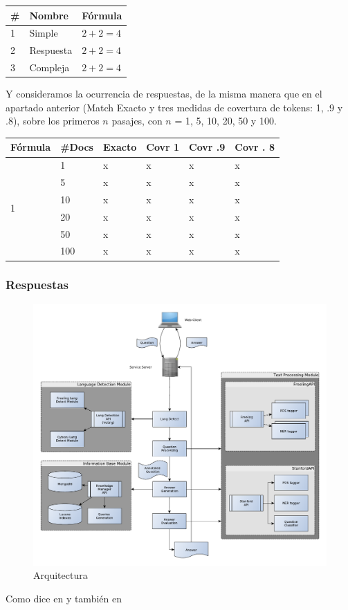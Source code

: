 \begin{center}
\begin{tabular}{|l|l|l|}
\hline
\#& Nombre & Fórmula \\ \hline
1& Simple & $2+2=4$ \\ \hline
2& Respuesta & $2+2=4$ \\ \hline
3& Compleja & $2+2=4$ \\ \hline
\end{tabular}
\end{center}

Y consideramos la ocurrencia de respuestas, de la misma manera que en el apartado anterior (Match Exacto y tres medidas de covertura de tokens: 1, .9 y .8), 
sobre los primeros $n$ pasajes, con $n$ = 1, 5, 10, 20, 50 y 100.

\begin{center}
\begin{tabular}{|l|l|l|l|l|l|}
\hline
Fórmula & \#Docs & Exacto & Covr 1 & Covr .9 & Covr . 8 \\ \hline
\multirow{6}{*}{1} & 1 & x & x & x & x \\  \cline{2-6}
 & 5 & x & x & x & x \\ \cline{2-6}
 & 10 & x & x & x & x \\ \cline{2-6}
 & 20 & x & x & x & x \\ \cline{2-6}
 & 50 & x & x & x & x \\ \cline{2-6}
 & 100 & x & x & x & x \\ \hline
\end{tabular}
\end{center}


\subsubsection{Respuestas}





\begin{figure}
  \centering
    \includegraphics[scale=0.86]{graficos/Architecture}
  \caption{Arquitectura}
  \label{fig:Architecture}
\end{figure}

Como dice en \cite{greenwade93} y también en \cite{RE1}
%
